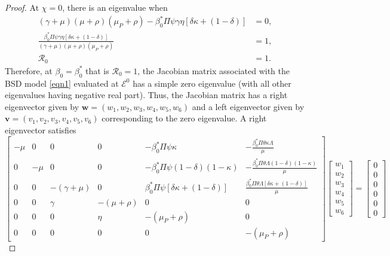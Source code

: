 \documentclass[10pt,a4paper]{amsart}
\newcommand\bfv{\mathbf{v}}
\newcommand\bfw{\mathbf{w}}
\begin{document}
\begin{proof}
    At $\chi=0$, there is an eigenvalue when
    \begin{align*}
        (\gamma+\mu)(\mu+\rho)(\mu_P+\rho)-\beta_0^*\Pi\psi\gamma\eta[\delta\kappa+(1-\delta)]&=0,\\
        \frac{\beta_0^*\Pi\psi\gamma\eta[\delta\kappa+(1-\delta)]}{(\gamma+\mu)(\mu+\rho)(\mu_P+\rho)}&=1,\\
        \mathcal{R}_0&=1.
    \end{align*}
    Therefore, at $\beta_0=\beta_0^*$ that is $\mathcal{R}_0=1$, the Jacobian matrix associated with the BSD model \eqref{eqn1}  evaluated at $\mathcal{E}^0$ has a simple zero eigenvalue (with all other eigenvalues having negative real part). Thus, the Jacobian matrix has a right eigenvector given by $\bfw=(w_1,w_2,w_3,w_4,w_5,w_6)$ and a left eigenvector given by $\bfv=(v_1,v_2,v_3,v_4,v_5,v_6)$ corresponding to the zero eigenvalue. A right eigenvector satisfies
    \begin{equation}\label{eqn10}
        \begin{bmatrix}
            -\mu&0&0&0&-\beta_0^*\Pi\psi\kappa&-\frac{\beta_0^*\Pi\theta\kappa\Lambda}{\mu}\\
            0&-\mu&0&0&-\beta_0^*\Pi\psi(1-\delta)(1-\kappa)&-\frac{\beta_0^*\Pi\theta\Lambda(1-\delta)(1-\kappa)}{\mu}\\
            0&0&-(\gamma+\mu)&0&\beta_0^*\Pi\psi[\delta\kappa+(1-\delta)]&\frac{\beta_0^*\Pi\theta\Lambda[\delta\kappa+(1-\delta)]}{\mu}\\
            0&0&\gamma&-(\mu+\rho)&0&0\\
            0&0&0&\eta&-(\mu_P+\rho)&0\\
            0&0&0&0&0&-(\mu_P+\rho)
        \end{bmatrix}
        \begin{bmatrix}
            w_1\\w_2\\w_3\\w_4\\w_5\\w_6
        \end{bmatrix}
        =
        \begin{bmatrix}
            0\\0\\0\\0\\0\\0
        \end{bmatrix}
    \end{equation}

\end{proof}
\end{document}
